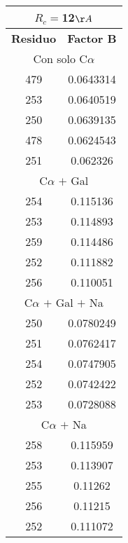\begin{tabular}[c]{|c|c|}
\multicolumn{2}{c}{$R_c=$12$\AA$}\\\hline
\textbf{Residuo}&\textbf{Factor B}\\\hline
\multicolumn{2}{c}{Con solo C$\alpha$}\\\hline
       479& 0.0643314\\
       253& 0.0640519\\
       250& 0.0639135\\
       478& 0.0624543\\
       251&  0.062326\\\hline
\multicolumn{2}{c}{C$\alpha$ $+$ Gal}\\\hline
       254&  0.115136\\
       253&  0.114893\\
       259&  0.114486\\
       252&  0.111882\\
       256&  0.110051\\\hline
\multicolumn{2}{c}{C$\alpha$ $+$ Gal $+$ Na}\\\hline
       250& 0.0780249\\
       251& 0.0762417\\
       254& 0.0747905\\
       252& 0.0742422\\
       253& 0.0728088\\\hline
\multicolumn{2}{c}{C$\alpha$ $+$ Na}\\\hline
       258&  0.115959\\
       253&  0.113907\\
       255&   0.11262\\
       256&   0.11215\\
       252&  0.111072\\\hline
\end{tabular}
